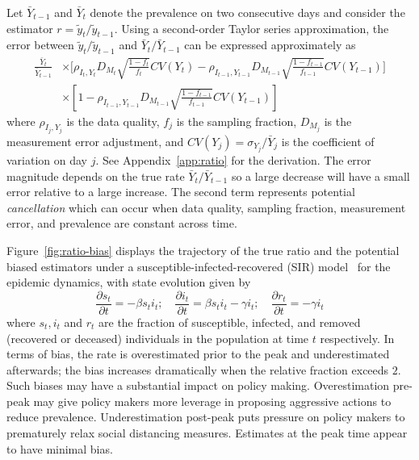 \documentclass[11pt]{amsart}
\numberwithin{equation}{section}
\theoremstyle{plain}
\begin{document}
 Let $\bar Y_{t-1}$ and $\bar Y_{t}$ denote the prevalence on two consecutive days and consider the estimator $r = \tilde y_t / \tilde y_{t-1}$.  Using a second-order Taylor series approximation, the error between ${\tilde y_t}/{\tilde y_{t-1}}$ and ${\bar Y_{t}}/{\bar Y_{t-1}}$ can be expressed approximately as
 $$
 \begin{aligned}
 \frac{\bar Y_t}{\bar Y_{t-1}} &\times \bigg[ \rho_{I_t,Y_t} D_{M_t} \sqrt{\frac{1-f_t}{f_t}} CV (Y_t)  -\rho_{I_{t-1},Y_{t-1}} D_{M_{t-1}} \sqrt{\frac{1-f_{t-1}}{f_{t-1}}} CV (Y_{t-1}) \bigg] \\
 &\times \left[ 1 - \rho_{I_{t-1},Y_{t-1}} D_{M_{t-1}} \sqrt{\frac{1-f_{t-1}}{f_{t-1}}} CV (Y_{t-1}) \right]
 \end{aligned}
 $$
 where $\rho_{I_j, Y_j}$ is the data quality, $f_j$ is the sampling fraction, $D_{M_j}$ is the measurement error adjustment, and $CV(Y_j) = \sigma_{Y_j}/ \bar Y_j$ is the coefficient of variation on day $j$.  See Appendix~\ref{app:ratio} for the derivation. The error magnitude depends on the true rate $\bar Y_{t} / \bar Y_{t-1}$ so a large decrease will have a small error relative to a large increase. The second term represents potential \emph{cancellation} which can  occur when data quality, sampling fraction, measurement error, and prevalence are constant across time.

 Figure~\ref{fig:ratio-bias} displays the trajectory of the true ratio and the potential biased estimators under a susceptible-infected-recovered (SIR) model~\citep{Pastor2001,Newman2002,Parshani2010} for the epidemic dynamics, with state evolution given by
 \begin{equation}
 \label{eq:sir}
 \frac{\partial s_t}{\partial t} = - \beta s_t i_t; \quad
 \frac{\partial i_t}{\partial t} = \beta s_t i_t - \gamma i_t; \quad
 \frac{\partial r_t}{\partial t} = - \gamma i_t
 \end{equation}
 where $s_t, i_t$ and $r_t$ are the fraction of susceptible, infected, and removed (recovered or deceased) individuals in the population at time $t$ respectively.  In terms of bias, the rate is overestimated prior to the peak and underestimated afterwards; the bias increases dramatically when the relative fraction exceeds $2$.  Such biases may have a substantial impact on policy making.  Overestimation pre-peak may give policy makers more leverage in proposing aggressive actions to reduce prevalence.  Underestimation post-peak puts pressure on policy makers to prematurely relax social distancing measures.  Estimates at the peak time appear to have minimal bias.
\end{document}
